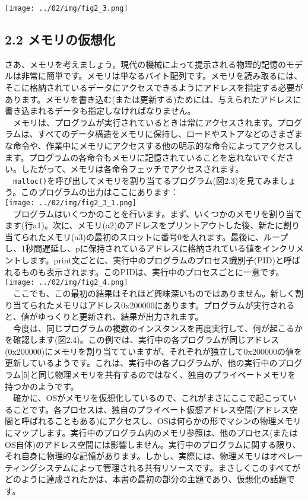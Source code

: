 \texttt{[image: ../02/img/fig2\_3.png]}

\hypertarget{ux30e1ux30e2ux30eaux306eux4eeeux60f3ux5316}{%
\subsection*{2.2
メモリの仮想化}\label{ux30e1ux30e2ux30eaux306eux4eeeux60f3ux5316}}

さあ、メモリを考えましょう。現代の機械によって提示される物理的記憶のモデルは非常に簡単です。メモリは単なるバイト配列です。メモリを読み取るには、そこに格納されているデータにアクセスできるようにアドレスを指定する必要があります。メモリを書き込む(または更新する)ためには、与えられたアドレスに書き込まれるデータも指定しなければなりません。\\
　メモリは、プログラムが実行されているときは常にアクセスされます。プログラムは、すべてのデータ構造をメモリに保持し、ロードやストアなどのさまざまな命令や、作業中にメモリにアクセスする他の明示的な命令によってアクセスします。プログラムの各命令もメモリに記憶されていることを忘れないでください。したがって、メモリは各命令フェッチでアクセスされます。\\
　\texttt{malloc()}を呼び出してメモリを割り当てるプログラム(図2.3)を見てみましょう。このプログラムの出力はここにあります：\\
\texttt{[image: ../02/img/fig2\_3\_1.png]}\\
　プログラムはいくつかのことを行います。まず、いくつかのメモリを割り当てます(行a1)。次に、メモリ(a2)のアドレスをプリントアウトした後、新たに割り当てられたメモリ(a3)の最初のスロットに番号0を入れます。最後に、ループし、1秒間遅延し、pに保持されているアドレスに格納されている値をインクリメントします。print文ごとに、実行中のプログラムのプロセス識別子(PID)と呼ばれるものも表示されます。このPIDは、実行中のプロセスごとに一意です。\\
\texttt{[image: ../02/img/fig2\_4.png]}\\
　ここでも、この最初の結果はそれほど興味深いものではありません。新しく割り当てられたメモリはアドレス0x200000にあります。プログラムが実行されると、値がゆっくりと更新され、結果が出力されます。\\
　今度は、同じプログラムの複数のインスタンスを再度実行して、何が起こるかを確認します(図2.4)。この例では、実行中の各プログラムが同じアドレス(0x200000)にメモリを割り当てていますが、それぞれが独立して0x200000の値を更新しているようです。これは、実行中の各プログラムが、他の実行中のプログラム{[}5{]}と同じ物理メモリを共有するのではなく、独自のプライベートメモリを持つかのようです。\\
　確かに、OSがメモリを仮想化しているので、これがまさにここで起こっていることです。各プロセスは、独自のプライベート仮想アドレス空間(アドレス空間と呼ばれることもある)にアクセスし、OSは何らかの形でマシンの物理メモリにマップします。実行中のプログラム内のメモリ参照は、他のプロセス(またはOS自体)のアドレス空間には影響しません。実行中のプログラムに関する限り、それ自身に物理的な記憶があります。しかし、実際には、物理メモリはオペレーティングシステムによって管理される共有リソースです。まさしくこのすべてがどのように達成されたかは、本書の最初の部分の主題であり、仮想化の話題です。

